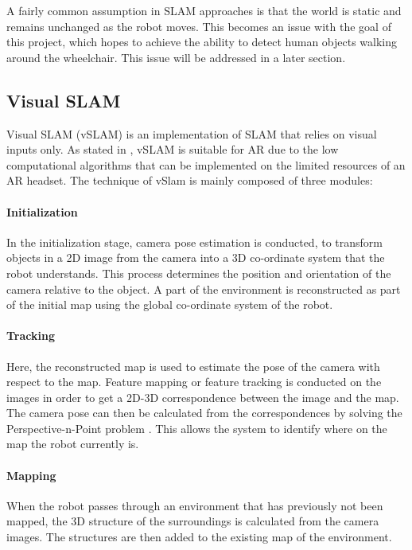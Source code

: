 \documentclass[12pt,a4paper]{report}
\begin{document}
A fairly common assumption in SLAM approaches is that the world is static and remains unchanged as the robot moves. This becomes an issue with the goal of this project, which hopes to achieve the ability to detect human objects walking around the wheelchair. This issue will be addressed in a later section.

\subsection{Visual SLAM}
Visual SLAM (vSLAM) is an implementation of SLAM that relies on visual inputs only. As stated in \cite{Taketomi2017}, vSLAM is suitable for AR due to the low computational algorithms that can be implemented on the limited resources of an AR headset. The technique of vSlam is mainly composed of three modules:

\paragraph{Initialization}
In the initialization stage, camera pose estimation is conducted, to transform objects in a 2D image from the camera into a 3D co-ordinate system that the robot understands. This process determines the position and orientation of the camera relative to the object. A part of the environment is reconstructed as part of the initial map using the global co-ordinate system of the robot.

\paragraph{Tracking}
Here, the reconstructed map is used to estimate the pose of the camera with respect to the map. Feature mapping or feature tracking is conducted on the images in order to get a 2D-3D correspondence between the image and the map. The camera pose can then be calculated from the correspondences by solving the Perspective-n-Point problem \citep{Nister2004}. This allows the system to identify where on the map the robot currently is.

\paragraph{Mapping}
When the robot passes through an environment that has previously not been mapped, the 3D structure of the surroundings is calculated from the camera images. The structures are then added to the existing map of the environment.
\end{document}
